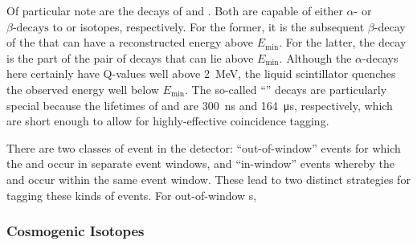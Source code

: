 \begin{figure}
    \centering
    \caption[]{}
    \label{fig:u_th_decay_chains}
\end{figure}

Of particular note are the decays of  and . Both are capable of either $\alpha\textrm{-}$ or $\beta\textrm{-decays}$ to  or  isotopes, respectively. For the former, it is the subsequent $\beta$-decay of the  that can have a reconstructed energy above $E_{\textrm{min}}$. For the latter, the  decay is the part of the pair of decays that can lie above $E_{\textrm{min}}$. Although the $\alpha$-decays here certainly have Q-values well above \SI{2}{\MeV}, the liquid scintillator quenches the observed energy well below $E_{\mathrm{min}}$. The so-called ``'' decays are particularly special because the lifetimes of  and  are \SI{300}{\nano\second} and \SI{164}{\micro\second}, respectively, which are short enough to allow for highly-effective coincidence tagging.

There are two classes of  event in the detector: ``out-of-window'' events for which the  and  occur in separate event windows, and ``in-window'' events whereby the  and  occur within the same event window. These lead to two distinct strategies for tagging these kinds of events. For out-of-window s, 

\subsubsection{Cosmogenic Isotopes}



